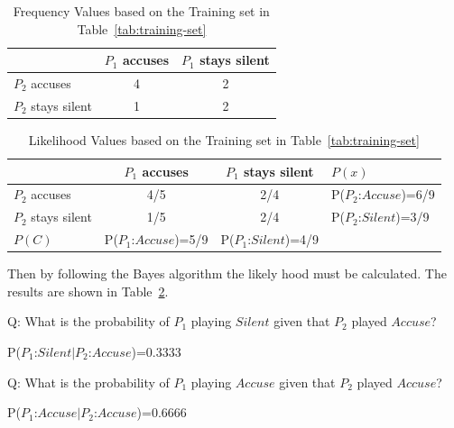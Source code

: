 \documentclass{acm_proc_article-sp}
\begin{document}
\begin{table}
\centering
\begin{tabular}{l | c | c}
                     & $P_1$ accuses    & $P_1$ stays silent \\
  \hline
  $P_2$ accuses      & 4 				& 2 				 \\
  \hline
  $P_2$ stays silent & 1 				& 2   				 \\
\end{tabular}
\caption{Frequency Values based on the Training set in Table~\ref{tab:training-set}}
\label{tab:frequency-val}
\end{table}

\begin{table}
\centering
\begin{tabular}{l | c | c | l}
                     & $P_1$ accuses       & $P_1$ stays silent  & $P(x)$ \\
  \hline
  $P_2$ accuses      & 4/5   	 & 2/4	   &  P($P_2$:$Accuse$)=6/9 	  \\
  \hline
  $P_2$ stays silent & 1/5		 & 2/4 	   &  P($P_2$:$Silent$)=3/9 	  \\
  \hline
  $P(C)$ 			 & P($P_1$:$Accuse$)=5/9 & P($P_1$:$Silent$)=4/9 &    \\
  \end{tabular}
\caption{Likelihood Values based on the Training set in Table~\ref{tab:training-set}}
\label{tab:likelihood-val}
\end{table}

Then by following the Bayes algorithm the likely hood must be calculated. The results
are shown in Table~\ref{tab:likelihood-val}.

Q: What is the probability of $P_1$ playing $Silent$ given that $P_2$ played $Accuse$? 
\begin{center} 
P($P_1$:$Silent$$|$$P_2$:$Accuse$)=0.3333
\end{center}

Q: What is the probability of $P_1$ playing $Accuse$ given that $P_2$ played $Accuse$? 
\begin{center} 
P($P_1$:$Accuse$$|$$P_2$:$Accuse$)=0.6666
\end{center}

\end{document}
